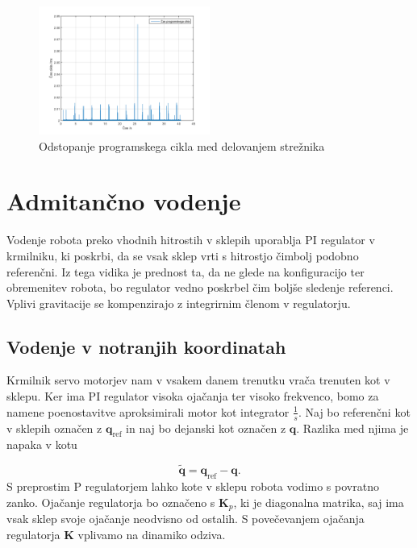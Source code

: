 \documentclass[a4paper]{article}
\begin{document}
\begin{figure}[!h]
	\centering
	\includegraphics[width=0.5\textwidth]{./slike/figure_jitter}
	\caption{Odstopanje programskega cikla med delovanjem strežnika}
	\label{fig:jittergraph}
	
\end{figure}

\section{Admitančno vodenje}

Vodenje robota preko vhodnih hitrostih v sklepih uporablja PI regulator v krmilniku, ki poskrbi, da se vsak sklep vrti s hitrostjo čimbolj podobno referenčni. Iz tega vidika je prednost ta, da ne glede na konfiguracijo ter obremenitev robota, bo regulator vedno poskrbel čim boljše sledenje referenci. Vplivi gravitacije se kompenzirajo z integrirnim členom v regulatorju. 


\subsection{Vodenje v notranjih koordinatah} \label{sec:admit_inner}

Krmilnik servo motorjev nam v vsakem danem trenutku vrača trenuten kot v sklepu. Ker ima PI regulator visoka ojačanja ter visoko frekvenco, bomo za namene poenostavitve aproksimirali motor kot integrator $\frac{1}{s}$. Naj bo referenčni kot v sklepih označen z $\textbf{q}_{\mathrm{ref}}$ in naj bo dejanski kot označen z $\textbf{q}$. Razlika med njima je napaka v kotu 

\begin{equation}
\tilde{\textbf{q}} = \textbf{q}_{\mathrm{ref}} - \textbf{q}.
\end{equation}
S preprostim P regulatorjem lahko kote v sklepu robota vodimo s povratno zanko. Ojačanje regulatorja bo označe\-no s $\textbf{K}_p$, ki je diagonalna matrika, saj ima vsak sklep svoje ojačanje neodvisno od ostalih. S povečevanjem ojačanja regulatorja \textbf{K} vplivamo na dinamiko odziva.
\end{document}
